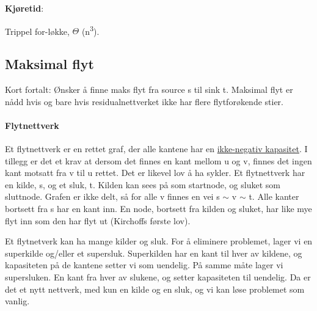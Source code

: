 \documentclass[12pt]{report}
\begin{document}
\vspace{\baselineskip}
\textbf{Kjøretid}: \par

Trippel for-løkke, $ \Theta $ (n\textsuperscript{3}).\par


\vspace{\baselineskip}
\setlength{\parskip}{6.0pt}

\vspace{\baselineskip}\subsection*{Maksimal flyt}
\setlength{\parskip}{10.56pt}
Kort fortalt: Ønsker å finne maks flyt fra source s til sink t. Maksimal flyt er nådd hvis og bare hvis residualnettverket ikke har flere flytforøkende stier.\par

\paragraph*{Flytnettverk}
Et flytnettverk er en rettet graf, der alle kantene har en \uline{ikke-negativ kapasitet}. I tillegg er det et krav at dersom det finnes en kant mellom u og v, finnes det ingen kant motsatt fra v til u  rettet. Det er likevel lov å ha sykler. Et flytnettverk har en kilde, s, og et sluk, t. Kilden kan sees på som startnode, og sluket som sluttnode. Grafen er ikke delt, så for alle v finnes en vei s $ \sim $  v $ \sim $  t. Alle kanter bortsett fra s har en kant inn. En node, bortsett fra kilden og sluket, har like mye flyt inn som den har flyt ut (Kirchoffs første lov). \par

Et flytnetverk kan ha mange kilder og sluk. For å eliminere problemet, lager vi en superkilde og/eller et supersluk. Superkilden har en kant til hver av kildene, og kapasiteten på de kantene setter vi som uendelig. På samme måte lager vi supersluken. En kant fra hver av slukene, og setter kapasiteten til uendelig. Da er det et nytt nettverk, med kun en kilde og en sluk, og vi kan løse problemet som vanlig.\par
\end{document}
